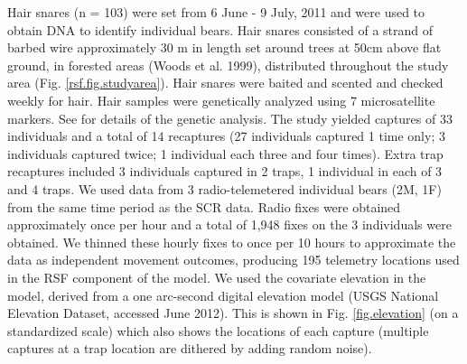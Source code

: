 Hair snares (n = 103) were set from 6 June - 9 July, 2011 and were
used to obtain DNA to identify individual bears.  Hair snares
consisted of a strand of barbed wire approximately 30 m in length set
around trees at 50cm above flat ground, in forested areas (Woods et
al. 1999), distributed throughout the study area (Fig. \ref{rsf.fig.studyarea}). Hair snares
were baited and scented and checked weekly for hair. Hair samples were
genetically analyzed using 7 microsatellite markers. See \citet{sun:2013}
for details of the genetic analysis.
 The study yielded
captures of 33 individuals and a total of 14 recaptures (27
individuals captured 1 time only; 3 individuals captured twice; 1
individual each three and four times). Extra trap recaptures included
3 individuals captured in 2 traps, 1 individual in each of 3 and 4
traps.  We used data from 3 radio-telemetered individual bears (2M,
1F) from the same time period as the SCR data. Radio fixes were
obtained approximately once per hour and a total of 1,948 fixes on the
3 individuals were obtained. We thinned these hourly fixes to once per
10 hours to approximate the data as independent movement outcomes,
producing 195 telemetry locations used in the RSF component of the
model.  We used the covariate elevation in the model, derived from a
one arc-second digital elevation model (USGS National Elevation
Dataset, accessed June 2012).  This is shown in
Fig. \ref{fig.elevation} (on a
standardized scale) which also shows the locations of each capture
(multiple captures at a trap location are dithered by adding random
noise).


